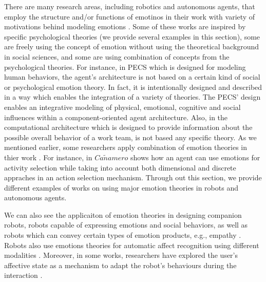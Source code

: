 \documentclass[11pt]{article}
\begin{document}
There are many research areas, including robotics and autonomous agents, that
employ the structure and/or functions of emotinos in their work with variety of
motivations behind modeling emotions \cite{wehrle:motivations-modeling-emotion}.
Some of these works are inspired by specific psychological theories (we provide
several examples in this section), some are freely using the concept of emotion
without using the theoretical background in social sciences, and some are using
combination of concepts from the psychological theories. For instance, in PECS
\cite{urban:pecs} which is designed for modeling human behaviors, the agent's
architecture is not based on a certain kind of social or psychological emotion
theory. In fact, it is intentionally designed and described in a way which
enables the integration of a variety of theories. The PECS' design enables an
integrative modeling of physical, emotional, cognitive and social influences
within a component-oriented agent architecture. Also, in
\cite{miranda:teamwork-multiagent-system} the computational architecture which
is designed to provide information about the possible overall behavior of a work
team, is not based any specific theory. As we mentioned earlier, some
researchers apply combination of emotion theories in thier work
\cite{kiryazov:modeling-appraisal-pad}. For instance, in
\cite{canamero:designing-activity-selection} $Ca\tilde{n}amero$ shows how an
agent can use emotions for activity selection while taking into account both
dimensional and discrete appraches in an action selection mechanism. Through out
this section, we provide different examples of works on using major emotion
theories in robots and autonomous agents.

We can also see the applicaiton of emotion theories in designing companion
robots, robots capable of expressing emotions and social behaviors, as well
as robots which can convey certain types of emotion products, e.g., empathy
\cite{breazeal:expressive-behavior} \cite{leite:empathy-hri}
\cite{paiva:emotion-modeling} \cite{shayganfar:methodology}. Robots also use
emotions theories for automatic affect recognition using different modalities
\cite{hegel:empathic-robot} \cite{zeng:affect-recognition}. Moreover, in some
works, researchers have explored the user’s affective state as a mechanism to
adapt the robot’s behaviours during the interaction
\cite{breazeal:sociable-robot} \cite{liu:affect-robot-behavior}.\\
\end{document}
